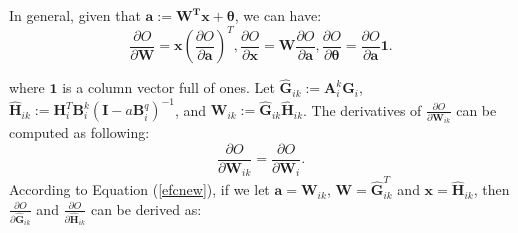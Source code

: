 \documentclass{article}
\begin{document}
In general, given that $\mathbf{a}:=\mathbf{W^T}\mathbf{x}+\bm{\theta}$, we can have:
\begin{equation}
\label{efcnew}
\frac{\partial O}{\partial \mathbf{W}} = \mathbf{x} (\frac{\partial O}{\partial \mathbf{a}})^T,
\frac{\partial O}{\partial \mathbf{x}} = \mathbf{W}\frac{\partial O}{\partial \mathbf{a}},
\frac{\partial O}{\partial \bm{\theta}} = \frac{\partial O}{\partial \mathbf{a}} \mathbf{1}.
\end{equation}





where $\mathbf{1}$ is a column vector full of ones. Let $\mathbf{\hat{G}}_{ik}:=\mathbf{A}_i^k\mathbf{G}_i$, $\mathbf{\hat{H}}_{ik}:=\mathbf{H}_i^T\mathbf{B}_i^k(\mathbf{I} - a\mathbf{B}_i^q)^{-1}$, and $\mathbf{W}_{ik}:=\mathbf{\hat{G}}_{ik}\mathbf{\hat{H}}_{ik}$. The derivatives of $\frac{\partial O}{\partial \mathbf{W}_{ik}}$ can be computed as following:
\begin{equation}
\label{efc3}
\frac{\partial O}{\partial \mathbf{W}_{ik}} = \frac{\partial O}{\partial \mathbf{W}_i}.
\end{equation}
According to Equation (\ref{efcnew}), if we let $\mathbf{a}=\mathbf{W}_{ik}$, $\mathbf{W}=\mathbf{\hat{G}}_{ik}^T$ and $\mathbf{x}=\mathbf{\hat{H}}_{ik}$, then $\frac{\partial O}{\partial \mathbf{\hat{G}}_{ik}}$ and $\frac{\partial O}{\partial \mathbf{\hat{H}}_{ik}}$ can be derived as:
\end{document}
